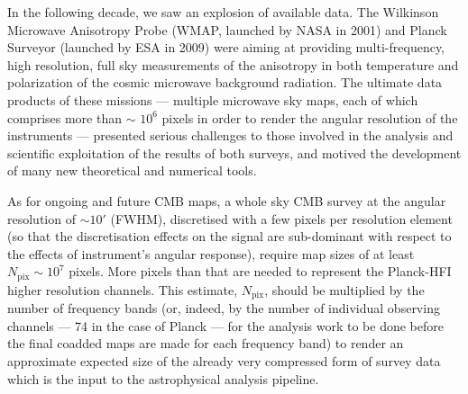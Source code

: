 \documentclass[12pt,twoside]{article}
\newcommand{\npix}{N_{\mathrm{pix}}}
\begin{document}
In the following decade, we saw an explosion
of available data.
The  Wilkinson Microwave Anisotropy Probe (WMAP, launched by NASA in 2001) and Planck Surveyor 
(launched by ESA in 2009)
were aiming
at providing multi-frequency, high resolution, full sky measurements of the anisotropy in
both temperature and polarization of the cosmic microwave
background radiation.
The ultimate data products of these missions ---
multiple microwave sky maps, each of which comprises
more than $\sim $ $10^6$ pixels in order to render the angular 
resolution of the instruments ---
presented serious challenges to those involved in the
analysis and scientific exploitation of the results of both surveys, and motived
the development of many new theoretical and numerical tools.
 

As for ongoing and future CMB maps, a whole sky CMB survey  
at the angular resolution
of $\sim 10'$ (FWHM), discretised with 
a few pixels per resolution element 
(so that the discretisation effects on the signal are  
sub-dominant with respect to the effects of instrument's angular response),
require map sizes of at least 
$\npix \sim  10^7$ pixels.
More pixels than that are needed to represent the Planck-HFI higher 
resolution channels.
This estimate, $\npix$, should be multiplied by  the number of frequency bands 
(or, indeed, by the number of individual
observing channels --- 74 in the case of Planck --- for the analysis work 
to be done before the
final coadded maps are made for each frequency band) to render 
an approximate expected
size of the already very compressed form of survey data which is
the input to the astrophysical analysis pipeline. 


 
\end{document}
